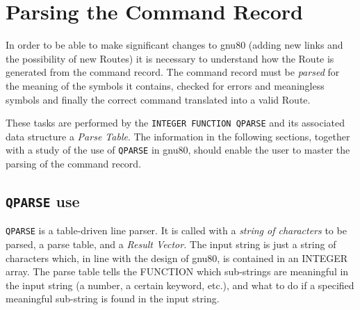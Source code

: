 
\section{Parsing the Command Record}
In order to be able to make significant changes to gnu80 (adding new
links and the possibility of new Routes) it is necessary to
understand how the Route is generated from the command record.
The command record must be {\em parsed} for the meaning of the
symbols it contains, checked for errors and meaningless symbols
and finally the correct command translated into a valid Route.

These tasks are performed by the {\tt INTEGER FUNCTION QPARSE} and its
associated data structure a {\em Parse Table}. The information
in the following sections, together with a study of the use of
{\tt QPARSE} in gnu80, should enable the user to master the
parsing of the command record.
\subsection{{\tt QPARSE} use}
{\tt QPARSE} is a table-driven line parser. It is called with a 
{\em string of characters} to
be parsed, a parse table, and a {\em Result Vector.} 
The input string is just
a string of characters which, in line with the design
of gnu80, is contained in an INTEGER array.  
The parse table tells the FUNCTION which sub-strings are meaningful
in the input string (a number, a certain keyword,
etc.), and what to do if a specified meaningful sub-string 
is found in the input string.

